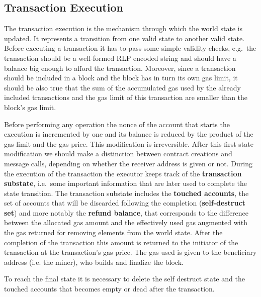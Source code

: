 \subsection{Transaction Execution}
The transaction execution is the mechanism through which the world state is
updated. It represents a transition from one
valid state to another valid state. Before executing a transaction it
has to pass some simple validity checks, e.g.\ the transaction should be a
well-formed RLP encoded string and should have a balance big enough to afford
the transaction.
Moreover, since a transaction should be included in a block and the block
has in turn its own gas limit, it should be also true that the sum 
of the accumulated gas used by the already included transactions and the gas
limit of this transaction are smaller than the block's gas limit.

Before performing any operation the nonce of the 
account that starts the execution is incremented by one and its balance is
reduced by the product of the gas limit and the gas price. This modification
is irreversible.
After this first state modification we should  make a distinction between
contract creations and message calls, depending on whether the receiver
address is given or not.
During the execution of the transaction the executor keeps track of the
\textbf{transaction substate}, i.e.\ some important information that
are later used to complete the state transition.
The transaction substate includes the \textbf{touched accounts}, the set of
accounts that will be discarded following the completion (\textbf{self-destruct
set}) and more notably the
\textbf{refund balance}, that corresponds
to the difference between the allocated gas amount and the effectively used
gas augmented with the gas returned for removing elements from the world
state. After the completion of the transaction this amount is returned to the
initiator of the transaction at the transaction's gas price.
The gas used is given to the beneficiary address (i.e. the miner), who builds 
and finalize the block.

To reach the final state it is necessary to delete the self destruct state and
the touched accounts that becomes empty or dead after the transaction.
